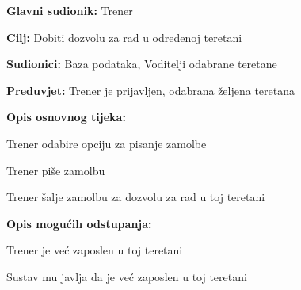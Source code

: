 				\noindent {}
					\begin{packed_item}
	
						\item \textbf{Glavni sudionik: } Trener
						\item  \textbf{Cilj:} Dobiti dozvolu za rad u određenoj teretani
						\item  \textbf{Sudionici:} Baza podataka, Voditelji odabrane teretane
						\item  \textbf{Preduvjet:} Trener je prijavljen, odabrana željena teretana
						\item  \textbf{Opis osnovnog tijeka:}
						
						\item[] \begin{packed_enum}
						
	                        \item Trener odabire opciju za pisanje zamolbe
							\item Trener piše zamolbu
							\item Trener šalje zamolbu za dozvolu za rad u toj teretani
						\end{packed_enum}
						
						\item  \textbf{Opis mogućih odstupanja:}
						
						\item[] \begin{packed_item}
	
							\item[-] Trener je već zaposlen u toj teretani
							\item[] \begin{packed_enum}
								
								\item Sustav mu javlja da je već zaposlen u toj teretani
								
							\end{packed_enum}
							
						\end{packed_item}
					\end{packed_item}
				
